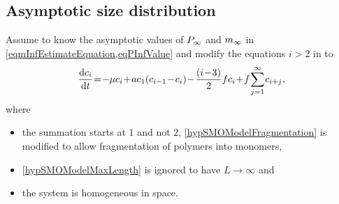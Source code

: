                 \hfill\blacksquare


            \subsection{Asymptotic size distribution}\label{apxAsymptoticSizeDistribution}

                Assume to know the asymptotic values of $P_\infty$ and $m_\infty$ in \cref{eqmInfEstimateEquation,eqPInfValue} and modify the equations $i>2$ in \SMOcontinuous{} to
                \begin{equation}
                    \SpazMate{1}{1}{1}
                    \derT{c_i}t=
                    -\mu c_i+ac_1(c_{i-1}-c_i)
                    -\frac{(i-3)}2fc_i
                    +f\sum_{j=1}^\infty c_{i+j},
                    \label{eqAsymSDDerModifiedithSMO}
                \end{equation}
                where

                \begin{itemize}[%
                    topsep=7.5pt,     %
                    itemsep=-2pt,	  %
                    leftmargin=20pt,  %
                    rightmargin=0pt,  %
                ] %
                    \item the summation starts at $1$ and not $2$, \ie{} \ref{hypSMOModelFragmentation} is modified to allow fragmentation of polymers into monomers,
                    \item \ref{hypSMOModelMaxLength} is ignored to have $L\to\infty$ and
                    \item the system is homogeneous in space.
                \end{itemize}

